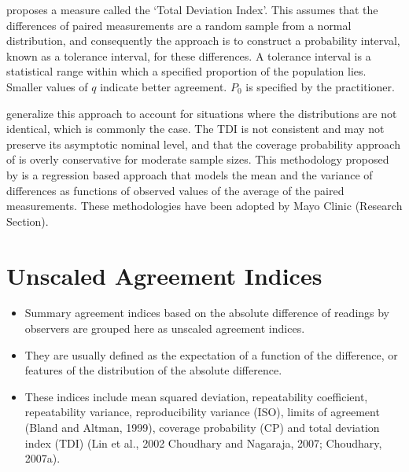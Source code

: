 \documentclass[MAIN.tex]{subfiles}
\begin{document}
	\citet{lin2002} proposes a measure called the `Total Deviation Index'. 
	This assumes that the differences of paired measurements are a random sample from a normal distribution, 
	and consequently the approach is to construct a probability interval, known as a tolerance interval, 
	for these differences. A tolerance interval is a statistical range within which a specified proportion 
	of the population lies.
	Smaller values of $q$ indicate better agreement. $P_{0}$ is specified by the practitioner.
	
	\citet{pkcng} generalize this approach to account for situations where the distributions are not identical, which is commonly the case.
	The TDI is not consistent and may not preserve its asymptotic nominal level, and that the coverage probability approach of \citet{lin2002} is overly conservative for moderate sample sizes.
	This methodology proposed by \citet{pkcng} is a regression based approach that models the mean and the variance of differences as functions of observed values of the average of the paired measurements.
	These methodologies have been adopted by Mayo Clinic (Research Section).
	
	
	
	
	\section{Unscaled Agreement Indices}
	\begin{itemize}
		\item Summary agreement indices based on the absolute difference of readings by observers are
		grouped here as unscaled agreement indices. 
		\item They are usually defined as the expectation
		of a function of the difference, or features of the distribution of the absolute difference.
		
		\item
		These indices include mean squared deviation, repeatability coefficient, repeatability variance,
		reproducibility variance (ISO), limits of agreement (Bland and Altman, 1999), coverage
		probability (CP) and total deviation index (TDI) (Lin et al., 2002 Choudhary and Nagaraja,
		2007; Choudhary, 2007a).
	\end{itemize}
	
	
\end{document}
